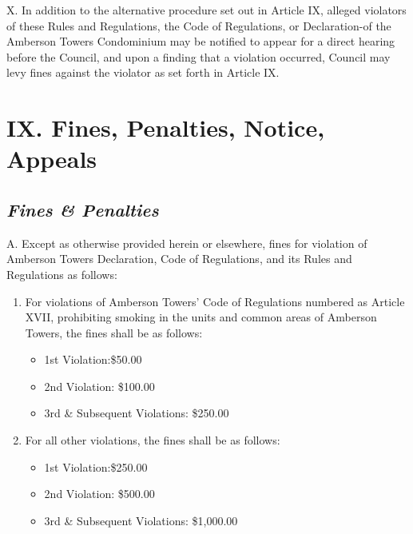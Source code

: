 \documentclass[
]{book}
\providecommand{\tightlist}{%
  \setlength{\itemsep}{0pt}\setlength{\parskip}{0pt}}
\begin{document}
X. In addition to the alternative procedure set out in Article IX, alleged violators of these Rules and Regulations, the Code of Regulations, or Declaration-of the Amberson Towers Condominium may be notified to appear for a direct hearing before the Council, and upon a finding that a violation occurred, Council may levy fines against the violator as set forth in Article IX.

\hypertarget{ix.-fines-penalties-notice-appeals-2}{%
\section*{IX. Fines, Penalties, Notice, Appeals}\label{ix.-fines-penalties-notice-appeals-2}}

\hypertarget{fines-penalties-2}{%
\subsection*{\texorpdfstring{\emph{Fines \& Penalties}}{Fines \& Penalties}}\label{fines-penalties-2}}

A. Except as otherwise provided herein or elsewhere, fines for violation of Amberson Towers Declaration, Code of Regulations, and its Rules and Regulations as follows:

\begin{enumerate}
\def\labelenumi{\arabic{enumi}.}
\tightlist
\item
  For violations of Amberson Towers' Code of Regulations numbered as Article XVII, prohibiting smoking in the units and common areas of Amberson Towers, the fines shall be as follows:

  \begin{itemize}
  \tightlist
  \item
    1st Violation:\$50.00
  \item
    2nd Violation: \$100.00
  \item
    3rd \& Subsequent Violations: \$250.00
  \end{itemize}
\item
  For all other violations, the fines shall be as follows:

  \begin{itemize}
  \tightlist
  \item
    1st Violation:\$250.00
  \item
    2nd Violation: \$500.00
  \item
    3rd \& Subsequent Violations: \$1,000.00
  \end{itemize}
\end{enumerate}
\end{document}
